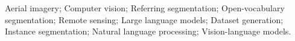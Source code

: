 \acresetall
\noindent Aerial imagery; Computer vision; Referring segmentation; Open-vocabulary segmentation; Remote sensing; Large language models; Dataset generation; Instance segmentation; Natural language processing; Vision-language models.